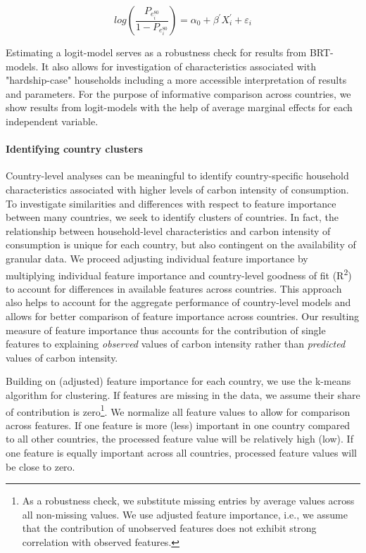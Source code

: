 \documentclass[12pt, a4paper]{article}
\begin{document}
\begin{equation} \label{logit}
    log \left( \frac{P_{e_{i}^{80}}}{1 - P_{e_{i}^{80}}} \right) = \alpha_{0} + \beta^{'} X_{i}^{'} + \varepsilon_{i}
\end{equation}

Estimating a logit-model serves as a robustness check for results from BRT-models. It also allows for investigation of characteristics associated with "hardship-case" households including a more accessible interpretation of results and parameters. For the purpose of informative comparison across countries, we show results from logit-models with the help of average marginal effects for each independent variable.

\paragraph{Identifying country clusters} Country-level analyses can be meaningful to identify country-specific household characteristics associated with higher levels of carbon intensity of consumption. To investigate similarities and differences with respect to feature importance between many countries, we seek to identify clusters of countries. In fact, the relationship between household-level characteristics and carbon intensity of consumption is unique for each country, but also contingent on the availability of granular data. We proceed adjusting individual feature importance by multiplying individual feature importance and country-level goodness of fit (R\textsuperscript{2}) to account for differences in available features across countries. This approach also helps to account for the aggregate performance of country-level models and allows for better comparison of feature importance across countries. Our resulting measure of feature importance thus accounts for the contribution of single features to explaining \textit{observed} values of carbon intensity rather than \textit{predicted} values of carbon intensity.

Building on (adjusted) feature importance for each country, we use the k-means algorithm for clustering. If features are missing in the data, we assume their share of contribution is zero\footnote{As a robustness check, we substitute missing entries by average values across all non-missing values. We use adjusted feature importance, i.e., we assume that the contribution of unobserved features does not exhibit strong correlation with observed features.}. We normalize all feature values to allow for comparison across features. If one feature is more (less) important in one country compared to all other countries, the processed feature value will be relatively high (low). If one feature is equally important across all countries, processed feature values will be close to zero.
\end{document}
